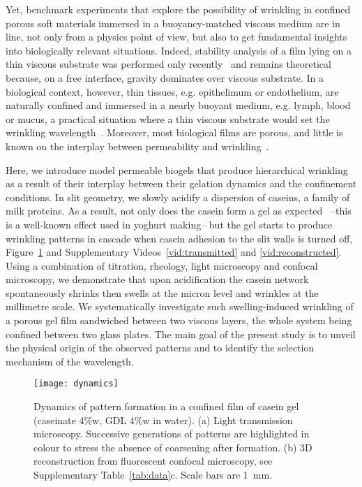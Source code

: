 \documentclass[twocolumn,superscriptaddress,showpacs,preprintnumbers,
amsmath,amssymb,prl]{revtex4-1}
\begin{document}


Yet, benchmark experiments that explore the possibility of wrinkling in confined porous soft materials immersed in a buoyancy-matched viscous medium are in line, not only from a physics point of view, but also to get fundamental insights into biologically relevant situations. Indeed, stability analysis of a film lying on a thin viscous substrate was performed only recently~\cite{Huang2002} and remains theoretical because, on a free interface, gravity dominates over viscous substrate. In a biological context, however, thin tissues, e.g. epithelimum or endothelium, are naturally confined and immersed in a nearly buoyant medium, e.g. lymph, blood or mucus, a practical situation where a thin viscous substrate would set the wrinkling wavelength~\cite{Fleury2015}. Moreover, most biological films are porous, and little is known on the interplay between permeability and wrinkling~\cite{Ma2004,Longley2013}.

Here, we introduce model permeable biogels that produce hierarchical wrinkling as a result of their interplay between their gelation dynamics and the confinement conditions. In slit geometry, we slowly acidify a dispersion of caseins, a family of milk proteins. As a result, not only does the casein form a gel as expected~\cite{Roefs1986,Bremer1989,Lucey1998,Dickinson2002} --this is a well-known effect used in yoghurt making-- but the gel starts to produce wrinkling patterns in cascade when casein adhesion to the slit walls is turned off, Figure~\ref{fig:dynamics} and Supplementary Videos~\ref{vid:transmitted} and \ref{vid:reconstructed}. Using a combination of titration, rheology, light microscopy and confocal microscopy, we demonstrate that upon acidification the casein network spontaneously shrinks then swells at the micron level and wrinkles at the millimetre scale. We systematically investigate such swelling-induced wrinkling of a porous gel film sandwiched between two viscous layers, the whole system being confined between two glass plates.  The main goal of the present study is to unveil the physical origin of the observed patterns and to identify the selection mechanism of the wavelength.

\begin{figure}
	\texttt{[image: dynamics]}%
	\caption{Dynamics of pattern formation in a confined film of casein gel (caseinate 4\%w, GDL 4\%w in water). (a) Light transmission microscopy. Successive generations of patterns are highlighted in colour to stress the absence of coarsening after formation. (b) 3D reconstruction from fluorescent confocal microscopy, see Supplementary Table~\ref{tab:data}c. Scale bars are \SI{1}{\milli\metre}.}%
	\label{fig:dynamics}%
\end{figure}
\end{document}
